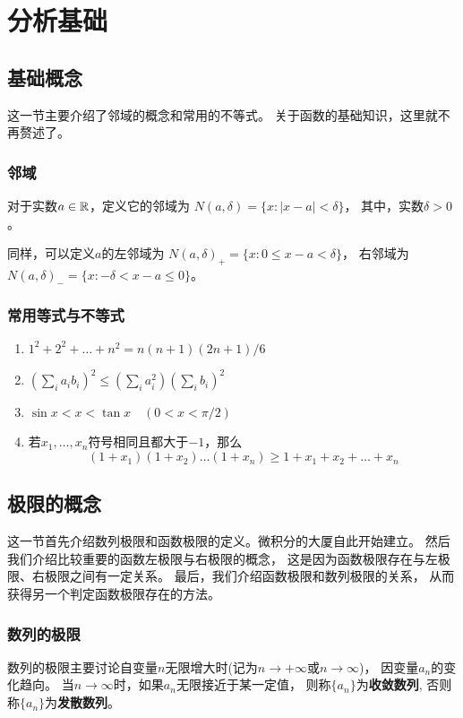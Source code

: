 \chapter{分析基础}

\section{基础概念}
这一节主要介绍了邻域的概念和常用的不等式。
关于函数的基础知识，这里就不再赘述了。

\subsection{邻域}
对于实数$a\in\mathbb{R}$，定义它的邻域为
$N(a,\delta) = \{ x: |x-a| < \delta \}$，
其中，实数$\delta > 0$。

同样，可以定义$a$的左邻域为
$N(a,\delta)_+ = \{ x: 0 \le x - a < \delta \}$，
右邻域为
$N(a,\delta)_- = \{ x: -\delta < x - a \le 0  \}$。

\subsection{常用等式与不等式}
\begin{enumerate}
  \item
  $1^2+2^2+\dots +n^2 = n(n+1)(2n+1)/6$
  \item
  $(\sum_{i}a_i b_i)^2 \le (\sum_{i}a_i^2)(\sum_{i}b_i)^2$
  \item
  $\sin x < x < \tan x \quad (0 < x < \pi/2)$
  \item
  若$x_1,\dots,x_n$符号相同且都大于$-1$，那么
  \[(1+x_1)(1+x_2)\dots(1+x_n)\ge 1+x_1+x_2+\dots+x_n\]
\end{enumerate}

\section{极限的概念}
这一节首先介绍数列极限和函数极限的定义。微积分的大厦自此开始建立。
然后我们介绍比较重要的函数左极限与右极限的概念，
这是因为函数极限存在与左极限、右极限之间有一定关系。
最后，我们介绍函数极限和数列极限的关系，
从而获得另一个判定函数极限存在的方法。

\subsection{数列的极限}
数列的极限主要讨论自变量$n$无限增大时(记为$n\to+\infty$或$n\to\infty$)，
因变量$a_n$的变化趋向。
当$n\to\infty$时，如果$a_n$无限接近于某一定值，
则称$\{a_n\}$为\textbf{收敛数列},
否则称$\{a_n\}$为\textbf{发散数列}。

